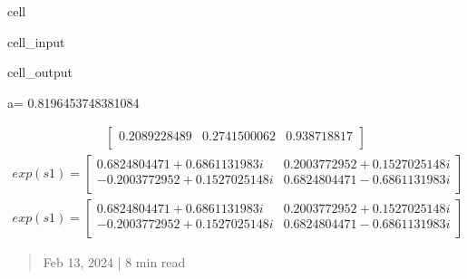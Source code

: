 \documentclass[letterpaper,10pt,english]{jupyterBook}
\begin{document}
\begin{sphinxuseclass}{cell}
\begin{sphinxVerbatimInput}
\begin{sphinxuseclass}{cell_input}
\begin{sphinxVerbatim}[commandchars=\\\{\}]
\end{sphinxVerbatim}

\end{sphinxuseclass}\end{sphinxVerbatimInput}
\begin{sphinxVerbatimOutput}

\begin{sphinxuseclass}{cell_output}
\begin{sphinxVerbatim}[commandchars=\\\{\}]
a= 0.8196453748381084
\end{sphinxVerbatim}
\begin{equation*}
\begin{split}\begin{bmatrix}
0.2089228489 & 0.2741500062 & 0.938718817  \\
 \end{bmatrix}
\end{split}
\end{equation*}\begin{equation*}
\begin{split}
exp(s1)=
\begin{bmatrix}
0.6824804471 + 0.6861131983 i & 0.2003772952 + 0.1527025148 i  \\
 -0.2003772952 + 0.1527025148 i & 0.6824804471 - 0.6861131983 i  \\
 \end{bmatrix}
\end{split}
\end{equation*}\begin{equation*}
\begin{split}
exp(s1)=
\begin{bmatrix}
0.6824804471 + 0.6861131983 i & 0.2003772952 + 0.1527025148 i  \\
 -0.2003772952 + 0.1527025148 i & 0.6824804471 - 0.6861131983 i  \\
 \end{bmatrix}
\end{split}
\end{equation*}
\end{sphinxuseclass}\end{sphinxVerbatimOutput}

\end{sphinxuseclass}
\sphinxstepscope
\begin{quote}

\sphinxAtStartPar
Feb 13, 2024 | 8 min read
\end{quote}
\end{document}

